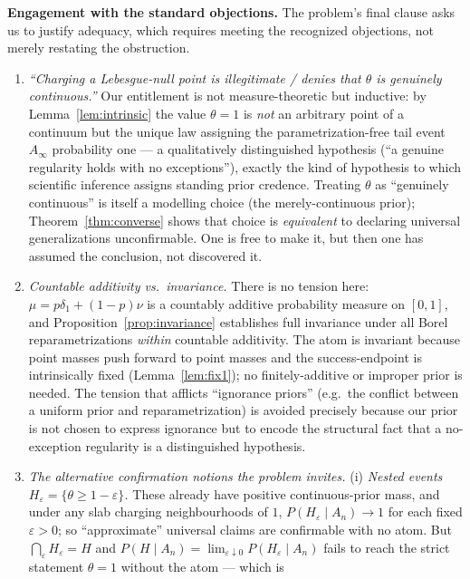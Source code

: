 \documentclass{amsart}
\theoremstyle{definition}
\begin{document}
\medskip
\noindent\textbf{Engagement with the standard objections.} The problem's final
clause asks us to justify adequacy, which requires meeting the recognized
objections, not merely restating the obstruction.
\begin{enumerate}
\item[(O1)] \emph{``Charging a Lebesgue-null point is illegitimate / denies that
$\theta$ is genuinely continuous.''} Our entitlement is not measure-theoretic but
inductive: by Lemma~\ref{lem:intrinsic} the value $\theta=1$ is \emph{not} an
arbitrary point of a continuum but the unique law assigning the
parametrization-free tail event $A_\infty$ probability one --- a qualitatively
distinguished hypothesis (``a genuine regularity holds with no exceptions''),
exactly the kind of hypothesis to which scientific inference assigns standing
prior credence. Treating $\theta$ as ``genuinely continuous'' is itself a modelling
choice (the merely-continuous prior); Theorem~\ref{thm:converse} shows that choice
is \emph{equivalent} to declaring universal generalizations unconfirmable. One is
free to make it, but then one has assumed the conclusion, not discovered it.
\item[(O2)] \emph{Countable additivity vs.\ invariance.} There is no tension here:
$\mu=p\delta_1+(1-p)\nu$ is a countably additive probability measure on $[0,1]$,
and Proposition~\ref{prop:invariance} establishes full invariance under all Borel
reparametrizations \emph{within} countable additivity. The atom is invariant
because point masses push forward to point masses and the success-endpoint is
intrinsically fixed (Lemma~\ref{lem:fix1}); no finitely-additive or improper prior
is needed. The tension that afflicts ``ignorance priors'' (e.g.\ the conflict
between a uniform prior and reparametrization) is avoided precisely because our
prior is not chosen to express ignorance but to encode the structural fact that a
no-exception regularity is a distinguished hypothesis.
\item[(O3)] \emph{The alternative confirmation notions the problem invites.} (i)
\emph{Nested events $H_\varepsilon=\{\theta\ge1-\varepsilon\}$.} These already have
positive continuous-prior mass, and under any slab charging neighbourhoods of $1$,
$P(H_\varepsilon\mid A_n)\to1$ for each fixed $\varepsilon>0$; so ``approximate''
universal claims are confirmable with no atom. But $\bigcap_\varepsilon
H_\varepsilon=H$ and $P(H\mid A_n)=\lim_{\varepsilon\downarrow0}P(H_\varepsilon\mid
A_n)$ fails to reach the strict statement $\theta=1$ without the atom --- which is

\end{enumerate}
\end{document}
